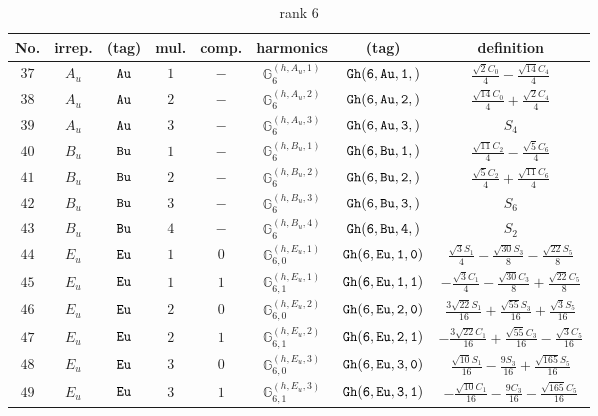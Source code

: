 \documentclass[fleqn,8pt]{jsarticle}
\begin{document}
\begin{table}[ht!]
\begin{center}
\caption{rank 6}
\renewcommand{\arraystretch}{1.3}
\begin{tabular}{cccccccc} \hline \hline
No. & irrep. & (tag) & mul. & comp. & harmonics & (tag) & definition \\ \hline
$ 37 $ & $ A_{u} $ & $ {\tt Au} $ & $ 1 $ & $ - $ & $ \mathbb{G}_{6}^{(h,A_{u},1)} $ & $ {\tt Gh(6,Au,1,)} $ & $ \frac{\sqrt{2} C_{0}}{4} - \frac{\sqrt{14} C_{4}}{4} $ \\
$ 38 $ & $ A_{u} $ & $ {\tt Au} $ & $ 2 $ & $ - $ & $ \mathbb{G}_{6}^{(h,A_{u},2)} $ & $ {\tt Gh(6,Au,2,)} $ & $ \frac{\sqrt{14} C_{0}}{4} + \frac{\sqrt{2} C_{4}}{4} $ \\
$ 39 $ & $ A_{u} $ & $ {\tt Au} $ & $ 3 $ & $ - $ & $ \mathbb{G}_{6}^{(h,A_{u},3)} $ & $ {\tt Gh(6,Au,3,)} $ & $ S_{4} $ \\
$ 40 $ & $ B_{u} $ & $ {\tt Bu} $ & $ 1 $ & $ - $ & $ \mathbb{G}_{6}^{(h,B_{u},1)} $ & $ {\tt Gh(6,Bu,1,)} $ & $ \frac{\sqrt{11} C_{2}}{4} - \frac{\sqrt{5} C_{6}}{4} $ \\
$ 41 $ & $ B_{u} $ & $ {\tt Bu} $ & $ 2 $ & $ - $ & $ \mathbb{G}_{6}^{(h,B_{u},2)} $ & $ {\tt Gh(6,Bu,2,)} $ & $ \frac{\sqrt{5} C_{2}}{4} + \frac{\sqrt{11} C_{6}}{4} $ \\
$ 42 $ & $ B_{u} $ & $ {\tt Bu} $ & $ 3 $ & $ - $ & $ \mathbb{G}_{6}^{(h,B_{u},3)} $ & $ {\tt Gh(6,Bu,3,)} $ & $ S_{6} $ \\
$ 43 $ & $ B_{u} $ & $ {\tt Bu} $ & $ 4 $ & $ - $ & $ \mathbb{G}_{6}^{(h,B_{u},4)} $ & $ {\tt Gh(6,Bu,4,)} $ & $ S_{2} $ \\
$ 44 $ & $ E_{u} $ & $ {\tt Eu} $ & $ 1 $ & $ 0 $ & $ \mathbb{G}_{6,0}^{(h,E_{u},1)} $ & $ {\tt Gh(6,Eu,1,0)} $ & $ \frac{\sqrt{3} S_{1}}{4} - \frac{\sqrt{30} S_{3}}{8} - \frac{\sqrt{22} S_{5}}{8} $ \\
$ 45 $ & $ E_{u} $ & $ {\tt Eu} $ & $ 1 $ & $ 1 $ & $ \mathbb{G}_{6,1}^{(h,E_{u},1)} $ & $ {\tt Gh(6,Eu,1,1)} $ & $ - \frac{\sqrt{3} C_{1}}{4} - \frac{\sqrt{30} C_{3}}{8} + \frac{\sqrt{22} C_{5}}{8} $ \\
$ 46 $ & $ E_{u} $ & $ {\tt Eu} $ & $ 2 $ & $ 0 $ & $ \mathbb{G}_{6,0}^{(h,E_{u},2)} $ & $ {\tt Gh(6,Eu,2,0)} $ & $ \frac{3 \sqrt{22} S_{1}}{16} + \frac{\sqrt{55} S_{3}}{16} + \frac{\sqrt{3} S_{5}}{16} $ \\
$ 47 $ & $ E_{u} $ & $ {\tt Eu} $ & $ 2 $ & $ 1 $ & $ \mathbb{G}_{6,1}^{(h,E_{u},2)} $ & $ {\tt Gh(6,Eu,2,1)} $ & $ - \frac{3 \sqrt{22} C_{1}}{16} + \frac{\sqrt{55} C_{3}}{16} - \frac{\sqrt{3} C_{5}}{16} $ \\
$ 48 $ & $ E_{u} $ & $ {\tt Eu} $ & $ 3 $ & $ 0 $ & $ \mathbb{G}_{6,0}^{(h,E_{u},3)} $ & $ {\tt Gh(6,Eu,3,0)} $ & $ \frac{\sqrt{10} S_{1}}{16} - \frac{9 S_{3}}{16} + \frac{\sqrt{165} S_{5}}{16} $ \\
$ 49 $ & $ E_{u} $ & $ {\tt Eu} $ & $ 3 $ & $ 1 $ & $ \mathbb{G}_{6,1}^{(h,E_{u},3)} $ & $ {\tt Gh(6,Eu,3,1)} $ & $ - \frac{\sqrt{10} C_{1}}{16} - \frac{9 C_{3}}{16} - \frac{\sqrt{165} C_{5}}{16} $ \\
 \hline \hline
\end{tabular}
\end{center}
\end{table}
\end{document}
